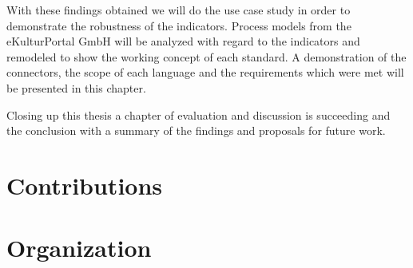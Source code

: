 With these findings obtained we will do the use case study in order to demonstrate the robustness of the indicators. Process models from the eKulturPortal GmbH will be analyzed with regard to the indicators and remodeled to show the working concept of each standard. A demonstration of the connectors, the scope of each language and the requirements which were met will be presented in this chapter. 

Closing up this thesis a chapter of evaluation and discussion is succeeding and the conclusion with a summary of the findings and proposals for future work.
\section{Contributions}

\section{Organization}
